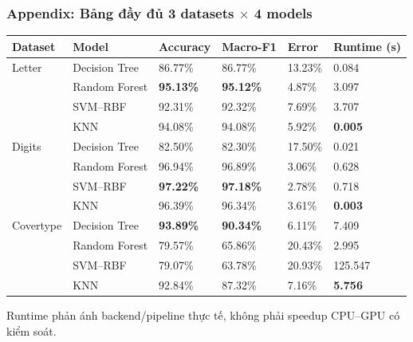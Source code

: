 \documentclass[aspectratio=169,12pt]{beamer}
\begin{document}
\begin{frame}
  \frametitle{Appendix: Bảng đầy đủ 3 datasets $\times$ 4 models}
  \scriptsize
  \begin{tabular}{@{}L{2.15cm}L{2.15cm}C{1.3cm}C{1.3cm}C{1.3cm}C{1.6cm}@{}}
    \toprule
    \textbf{Dataset} & \textbf{Model} & \textbf{Accuracy} & \textbf{Macro-F1} & \textbf{Error} & \textbf{Runtime (s)} \\
    \midrule
    Letter & Decision Tree & 86.77\% & 86.77\% & 13.23\% & 0.084 \\
           & Random Forest & \textbf{95.13\%} & \textbf{95.12\%} & 4.87\% & 3.097 \\
           & SVM--RBF & 92.31\% & 92.32\% & 7.69\% & 3.707 \\
           & KNN & 94.08\% & 94.08\% & 5.92\% & \textbf{0.005} \\
    \addlinespace
    Digits & Decision Tree & 82.50\% & 82.30\% & 17.50\% & 0.021 \\
           & Random Forest & 96.94\% & 96.89\% & 3.06\% & 0.628 \\
           & SVM--RBF & \textbf{97.22\%} & \textbf{97.18\%} & 2.78\% & 0.718 \\
           & KNN & 96.39\% & 96.34\% & 3.61\% & \textbf{0.003} \\
    \addlinespace
    Covertype & Decision Tree & \textbf{93.89\%} & \textbf{90.34\%} & 6.11\% & 7.409 \\
              & Random Forest & 79.57\% & 65.86\% & 20.43\% & 2.995 \\
              & SVM--RBF & 79.07\% & 63.78\% & 20.93\% & 125.547 \\
              & KNN & 92.84\% & 87.32\% & 7.16\% & \textbf{5.756} \\
    \bottomrule
  \end{tabular}
  \par\vspace{0.18cm}
  {\tiny Runtime phản ánh backend/pipeline thực tế, không phải speedup CPU--GPU có kiểm soát.}
\end{frame}
\end{document}
